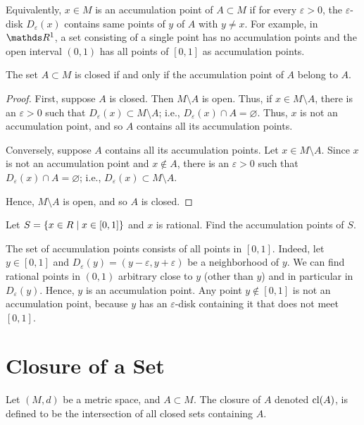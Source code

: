 \documentclass[../main-sheet.tex]{subfiles}
\begin{document}
Equivalently, $ x\in M $ is an accumulation point of $ A\subset M   $ if for every $ \varepsilon>0 $, the $ \varepsilon $-disk $ D_{\varepsilon}(x) $ contains same points of $ y $ of $ A $ with $ y\neq x $. For example, in $ \R^1 $, a set consisting of a single point has no accumulation points and the open interval $ (0,1) $ has all points of $ [0,1] $ as accumulation points.
\begin{thm}
    The set $ A\subset M $ is closed if and only if the accumulation point of $ A $ belong to $ A $.
\end{thm}
\begin{proof}
    First, suppose $ A $ is closed. Then $ M\setminus A $ is open. Thus, if $ x\in M\setminus A $, there is an $ \varepsilon>0 $ such that $ D_{\varepsilon}(x)\subset M\setminus A $; i.e., $ D_{\varepsilon}(x)\cap A=\varnothing $. Thus, $ x $ is not an accumulation point, and so $ A $ contains all its accumulation points.

    Conversely, suppose $ A $ contains all its accumulation points. Let $ x\in M\setminus A $. Since $ x $ is not an accumulation point and $ x\notin A $, there is an $ \varepsilon>0 $ such that $ D_{\varepsilon}(x)\cap A=\varnothing $; i.e., $ D_{\varepsilon}(x)\subset M\setminus A $.

    Hence, $ M\setminus A $ is open, and so $ A $ is closed.
\end{proof}
\begin{prob}
    Let $ S=\left\{x\in R\mid x\in [0,1]\right\} $ and $ x $ is rational. Find the accumulation points of $ S $.
\end{prob}
\begin{soln}
    The set of accumulation points consists of all points in $ [0,1] $. Indeed, let $ y\in [0,1] $ and $ D_{\varepsilon}(y)=(y-\varepsilon,y+\varepsilon) $ be a neighborhood of $ y $. We can find rational points in $ (0,1) $ arbitrary close to $ y $ (other than $ y $) and in particular in $ D_{\varepsilon}(y) $. Hence, $ y $ is an accumulation point. Any point $ y\notin [0,1] $ is not an accumulation point, because $ y $ has an $  \varepsilon$-disk containing it that does not meet $ [0,1] $.
\end{soln}
\section{Closure of a Set}
\begin{defn}
    Let $ (M,d) $ be a metric space, and $ A\subset M $. The closure of $ A $ denoted $ \operatorname{cl}(A) $, is defined to be the intersection of all closed sets containing $ A $.
\end{defn}
\end{document}
